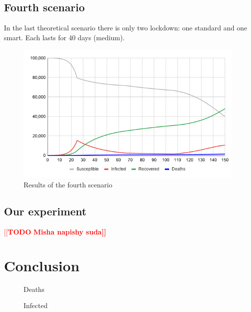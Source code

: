 \documentclass[12pt,a4paper,english]{article}
\newcommand{\todo}[1]{\noindent\textcolor{red}{[[\textbf{TODO} \textbf{#1]]}}\\}
\begin{document}
    \subsection{Fourth scenario}
    \label{fourth_scenario}
    In the last theoretical scenario there is only two lockdown: one standard and one smart.
    Each lasts for 40 days (medium).
    \begin{figure}[h!]
        \centering
        \includegraphics[scale=0.55]{med+smart.png}
        \caption{Results of the fourth scenario}
    \end{figure}

    \subsection{Our experiment}

    \todo{Misha napishy suda}

    \section{Conclusion} 
    \begin{figure}[h!]
        \centering
        \hfill
        \caption{Deaths}
    \end{figure}

    \begin{figure}[h!]
        \centering
        \hfill
        \caption{Infected}
    \end{figure}
\end{document}
